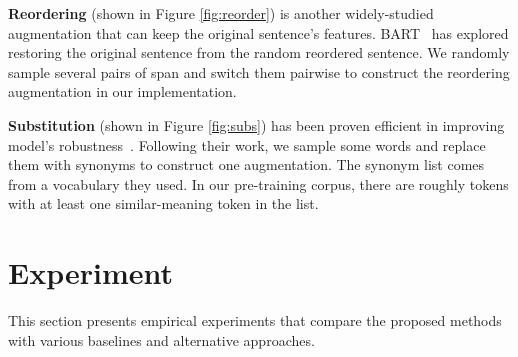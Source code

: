 \documentclass[11pt,a4paper]{article}
\begin{document}
\textbf{Reordering} (shown in  Figure \ref{fig:reorder}) is another widely-studied augmentation that can keep the original sentence's features. BART~\cite{lewis2019bart} has explored restoring the original sentence from the random reordered sentence. We randomly sample several pairs of span and switch them pairwise to construct the reordering augmentation in our implementation. 

\textbf{Substitution} (shown in Figure \ref{fig:subs}) has been proven efficient in improving model's robustness~\cite{jia2019certified}. Following their work, we sample some words and replace them with synonyms to construct one augmentation. The synonym list comes from a vocabulary they used. In our pre-training corpus, there are roughly  tokens with at least one similar-meaning token in the list. 
 \section{Experiment} \label{experiment}
This section presents empirical experiments that compare the proposed methods with various baselines and alternative approaches.
\end{document}
